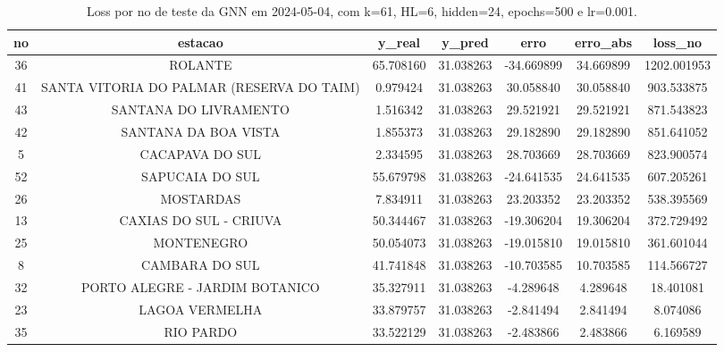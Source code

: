\begin{table}[h]
\centering
\caption{Loss por no de teste da GNN em 2024-05-04, com k=61, HL=6, hidden=24, epochs=500 e lr=0.001.}
\label{tab:gnn_loss_k61_hl6_h24_e500_d20240504}
\begin{tabular}{ccccccc}
\toprule
no & estacao & y\_real & y\_pred & erro & erro\_abs & loss\_no \\
\midrule
36 & ROLANTE & 65.708160 & 31.038263 & -34.669899 & 34.669899 & 1202.001953 \\
41 & SANTA VITORIA DO PALMAR (RESERVA DO TAIM) & 0.979424 & 31.038263 & 30.058840 & 30.058840 & 903.533875 \\
43 & SANTANA DO LIVRAMENTO & 1.516342 & 31.038263 & 29.521921 & 29.521921 & 871.543823 \\
42 & SANTANA DA BOA VISTA & 1.855373 & 31.038263 & 29.182890 & 29.182890 & 851.641052 \\
5 & CACAPAVA DO SUL & 2.334595 & 31.038263 & 28.703669 & 28.703669 & 823.900574 \\
52 & SAPUCAIA DO SUL & 55.679798 & 31.038263 & -24.641535 & 24.641535 & 607.205261 \\
26 & MOSTARDAS & 7.834911 & 31.038263 & 23.203352 & 23.203352 & 538.395569 \\
13 & CAXIAS DO SUL - CRIUVA & 50.344467 & 31.038263 & -19.306204 & 19.306204 & 372.729492 \\
25 & MONTENEGRO & 50.054073 & 31.038263 & -19.015810 & 19.015810 & 361.601044 \\
8 & CAMBARA DO SUL & 41.741848 & 31.038263 & -10.703585 & 10.703585 & 114.566727 \\
32 & PORTO ALEGRE - JARDIM BOTANICO & 35.327911 & 31.038263 & -4.289648 & 4.289648 & 18.401081 \\
23 & LAGOA VERMELHA & 33.879757 & 31.038263 & -2.841494 & 2.841494 & 8.074086 \\
35 & RIO PARDO & 33.522129 & 31.038263 & -2.483866 & 2.483866 & 6.169589 \\
\bottomrule
\end{tabular}
\end{table}
